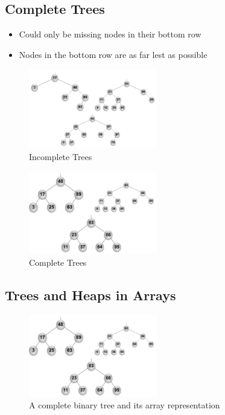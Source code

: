 \documentclass[
  10pt,
  english,
  letterpaper,
,tablecaptionabove
]{scrartcl}
\providecommand{\tightlist}{%
  \setlength{\itemsep}{0pt}\setlength{\parskip}{0pt}}
\begin{document}
\hypertarget{complete-trees}{%
\subsection{Complete Trees}\label{complete-trees}}

\begin{itemize}
\tightlist
\item
  Could only be missing nodes in their bottom row
\item
  Nodes in the bottom row are as far lest as possible
\end{itemize}

\begin{figure}
\centering
\includegraphics[width=0.5\textwidth,height=\textheight]{images/5.png}
\caption{Incomplete Trees}
\end{figure}

\begin{figure}
\centering
\includegraphics[width=0.5\textwidth,height=\textheight]{images/6.png}
\caption{Complete Trees}
\end{figure}

\hypertarget{trees-and-heaps-in-arrays}{%
\subsection{Trees and Heaps in Arrays}\label{trees-and-heaps-in-arrays}}

\begin{figure}
\centering
\includegraphics[width=0.5\textwidth,height=\textheight]{images/6.png}
\caption{A complete binary tree and its array representation}
\end{figure}
\end{document}
